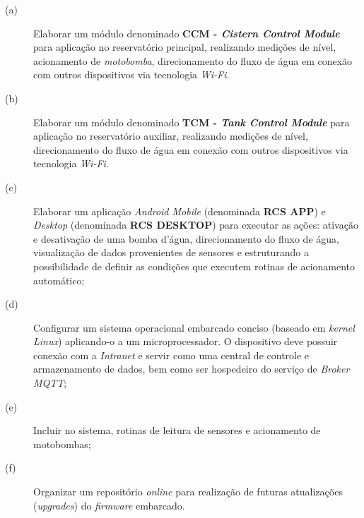 \begin{description}
	\item [(a)] Elaborar um módulo denominado \textbf{CCM - \textit{Cistern Control Module}} para aplicação no reservatório principal, realizando medições de nível, acionamento de \textit{motobomba}, direcionamento do fluxo de água em conexão com outros dispositivos via tecnologia \textit{Wi-Fi}.
	\item [(b)] Elaborar um módulo denominado \textbf{TCM - \textit{Tank Control Module}} para aplicação no reservatório auxiliar, realizando medições de nível, direcionamento do fluxo de água em conexão com outros dispositivos via tecnologia \textit{Wi-Fi}.
	\item [(c)] Elaborar um aplicação \textit{Android Mobile} (denominada \textbf{RCS APP}) e \textit{Desktop} (denominada \textbf{RCS DESKTOP}) para executar as ações: ativação e desativação de uma bomba d'água, direcionamento do fluxo de água, visualização de dados provenientes de sensores e estruturando a possibilidade de definir as condições que executem rotinas de acionamento automático;
	\item [(d)] Configurar um sistema operacional embarcado conciso (baseado em \textit{kernel Linux}) aplicando-o a um microprocessador. O dispositivo deve possuir conexão com a \textit{Intranet} e servir como uma central de controle e armazenamento de dados, bem como ser hospedeiro do serviço de \textit{Broker MQTT};
	\item [(e)] Incluir no sistema, rotinas de leitura de sensores e acionamento de motobombas;
	\item [(f)] Organizar um repositório \textit{online} para realização de futuras atualizações (\textit{upgrades}) do \textit{firmware} embarcado.
\end{description}

\label{sec:objetivosespecificos}
